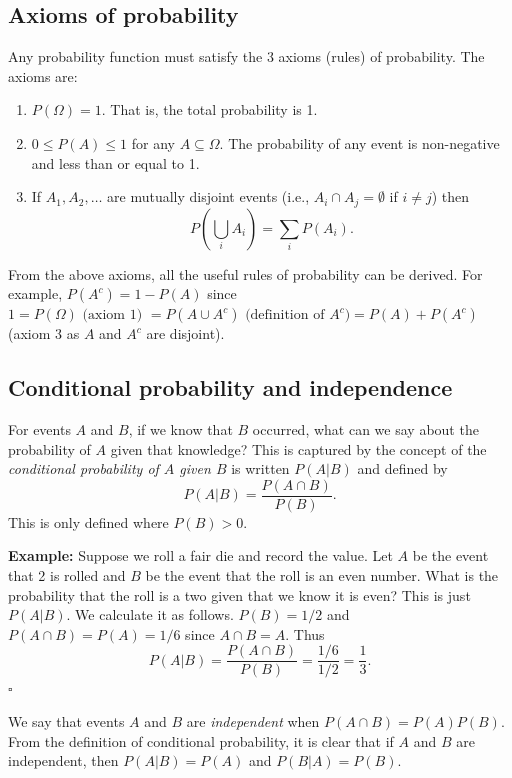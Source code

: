 \documentclass[11pt]{article}
\newcommand{\sqend}{\hfill $\square$}
\begin{document}
\subsection{Axioms of probability}


Any probability function must satisfy the 3 axioms (rules) of probability.  The axioms are:
\begin{enumerate}
\item $P(\Omega) = 1$.  That is, the total probability is 1.

\item $0 \leq P(A) \leq 1$ for any $A \subseteq \Omega$.   The probability of any event  is non-negative and less than or equal to 1.

\item If $A_1, A_2, \ldots$ are mutually disjoint events (i.e., $A_i \cap A_j = \emptyset$ if $i \neq j$) then 
\[ P\left( \bigcup_i A_i \right) = \sum_i P(A_i).
\]
\end{enumerate}
From the above axioms, all the useful rules of probability can be derived.  For example, $P(A^c) = 1 - P(A)$ since $1 =  P(\Omega) \mbox{ (axiom 1) }= P(A \cup A^c) \mbox{ (definition of }A^c) = P(A) + P( A^c) $ (axiom 3 as $A$ and $A^c$ are disjoint). 

\subsection{Conditional probability and independence}

For events $A$ and $B$, if we know that $B$ occurred, what can we say about the probability of $A$ given that knowledge?  This is captured by  the  concept of the {\em conditional probability of $A$ given $B$} is written $P(A|B)$ and defined by
\[ P(A|B) = \frac {P(A \cap B)}{P(B)}. \]
This is only defined where $P(B)>0$.  

{\bf Example:} Suppose we roll a fair die and record the value.  Let $A$ be the event that 2 is rolled and $B$ be the event that the roll is an even number. What is the probability that the roll is a two given that we know it is even?  This is just $P(A|B)$.  We calculate it as follows. $P(B) = 1/2$ and $P(A \cap B) = P(A) = 1/6$ since $A \cap B = A$.  Thus 
\[ P(A|B) =  \frac {P(A \cap B)}{P(B)} = \frac{1/6}{1/2} = \frac 1 3. \]\sqend   



We say that events $A$ and $B$ are {\em  independent} when $P(A \cap B) = P(A)P(B)$.  From the definition of conditional probability, it is clear that if $A$ and $B$ are independent, then $P(A|B) = P(A)$ and $P(B|A) = P(B)$.
\end{document}
